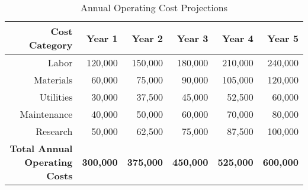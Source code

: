 \begin{table}[h]
\centering
\begin{tabular}{|r|r|r|r|r|r|}
\hline
\textbf{Cost Category} & \textbf{Year 1} & \textbf{Year 2} & \textbf{Year 3} & \textbf{Year 4} & \textbf{Year 5} \\
\hline
Labor & 120,000 & 150,000 & 180,000 & 210,000 & 240,000 \\
Materials & 60,000 & 75,000 & 90,000 & 105,000 & 120,000 \\
Utilities & 30,000 & 37,500 & 45,000 & 52,500 & 60,000 \\
Maintenance & 40,000 & 50,000 & 60,000 & 70,000 & 80,000 \\
Research & 50,000 & 62,500 & 75,000 & 87,500 & 100,000 \\
\hline
\textbf{Total Annual Operating Costs} & \textbf{300,000} & \textbf{375,000} & \textbf{450,000} & \textbf{525,000} & \textbf{600,000} \\
\hline
\end{tabular}
\caption{Annual Operating Cost Projections}
\end{table}

